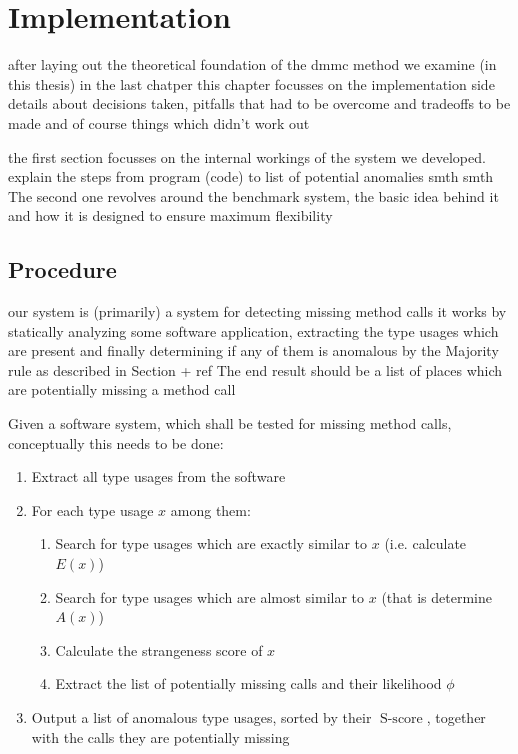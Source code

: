 \chapter{Implementation}\label{ch:impl}


after laying out the theoretical foundation of the dmmc method we examine (in this thesis) in the last chatper
this chapter focusses on the implementation side
details about decisions taken, pitfalls that had to be overcome and tradeoffs to be made
and of course things which didn't work out

the first section focusses on the internal workings of the system we developed.
explain the steps from program (code) to list of potential anomalies
smth smth
The second one revolves around the benchmark system, the basic idea behind it and how it is designed to ensure maximum flexibility

\section{Procedure}

our system is (primarily) a system for detecting missing method calls
it works by statically analyzing some software application, extracting the type usages which are present
and finally determining if any of them is anomalous by the Majority rule as described in Section + ref
The end result should be a list of places which are potentially missing a method call

Given a software system, which shall be tested for missing method calls, 
conceptually this needs to be done:

\begin{enumerate}
    \item Extract all type usages from the software
    \item For each type usage $x$ among them:
    \begin{enumerate}
        \item Search for type usages which are exactly similar to $x$ (i.e. calculate $E(x)$)
        \item Search for type usages which are almost similar to $x$ (that is determine $A(x)$)
        \item Calculate the strangeness score of $x$
        \item Extract the list of potentially missing calls and their likelihood $\phi$
    \end{enumerate}
    \item Output a list of anomalous type usages, sorted by their $\operatorname{S-score}$, together with the calls they are potentially missing
\end{enumerate}

